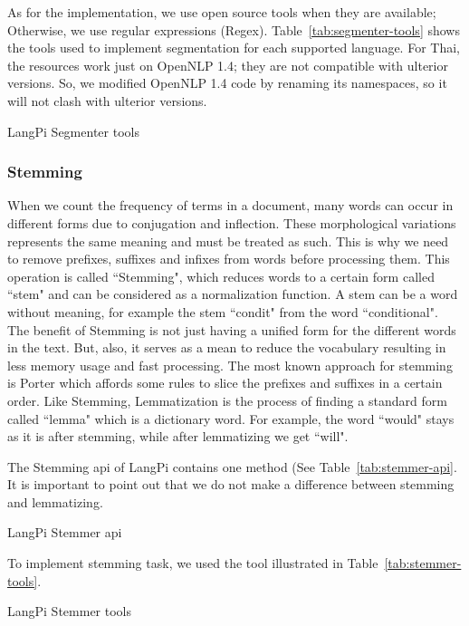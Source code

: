 As for the implementation, we use open source tools when they are available;
Otherwise, we use regular expressions (Regex).
Table~\ref{tab:segmenter-tools} shows the tools used to implement segmentation for each supported language.
For Thai, the resources work just on OpenNLP 1.4; they are not compatible with ulterior versions. 
So, we modified OpenNLP 1.4 code by renaming its namespaces, so it will not clash with ulterior versions.
\begin{table}[!ht]
	\centering
	\caption{LangPi Segmenter tools}
	\label{tab:segmenter-tools}
\end{table}

\subsubsection{Stemming}

When we count the frequency of terms in a document, many words can occur in different forms due to conjugation and inflection. 
These morphological variations represents the same meaning and must be treated as such. 
This is why we need to remove  prefixes, suffixes and infixes from words before processing them. 
This operation is called ``Stemming", which reduces words to a certain form called ``stem" and can be considered as a normalization function.
A stem can be a word without meaning, for example the stem ``condit" from the word ``conditional".
The benefit of Stemming is not just having a unified form for the different words in the text.
But, also, it serves as a mean to reduce the vocabulary resulting in less memory usage and fast processing.  
The most known approach for stemming is Porter \citep{97-porter} which affords some rules to slice the prefixes and suffixes in a certain order. 
Like Stemming, Lemmatization is the process of finding a standard form called ``lemma" which is a dictionary word. 
For example, the word ``would" stays as it is after stemming, while after lemmatizing we get ``will".

The Stemming \ac{api} of LangPi contains one method (See Table~\ref{tab:stemmer-api}.
It is important to point out that we do not make a difference between stemming and lemmatizing. 
\begin{table}[!ht]
	\centering
	\caption{LangPi Stemmer \ac{api}}
	\label{tab:stemmer-api}
\end{table}

To implement stemming task, we used the tool illustrated in Table~\ref{tab:stemmer-tools}.
\begin{table}[!ht]
	\centering
	\caption{LangPi Stemmer tools}
	\label{tab:stemmer-tools}
\end{table}


